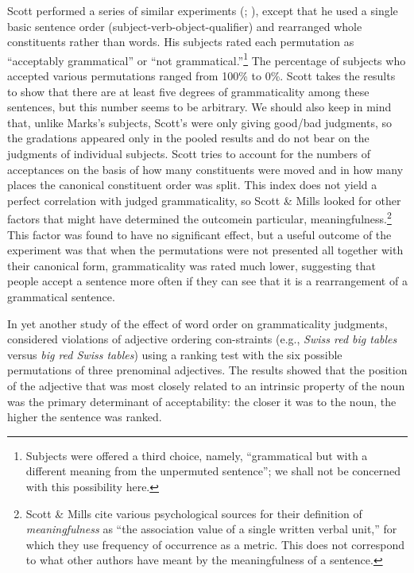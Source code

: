 Scott performed a series of similar experiments (\citealt{Scott1969}; \citealt{ScottEtAl1973}), except that he used a single basic sentence order (subject-verb-object-qualifier) and rearranged whole constituents rather than words. His subjects rated each permutation as ``acceptably grammatical'' or ``not grammatical.''\footnote{Subjects were offered a third choice, namely, ``grammatical but with a different meaning from the unpermuted sentence''; we shall not be concerned with this possibility here.}
The percentage of subjects who accepted various permutations ranged from 100\% to 0\%. Scott takes the results to show that there are at least five degrees of grammaticality among these sentences, but this number seems to be arbitrary. We should also keep in mind that, unlike Marks's subjects, Scott's were only giving good/bad judgments, so the gradations appeared only in the pooled results and do not bear on the judgments of individual subjects. Scott tries to account for the numbers of acceptances on the basis of how many constituents were moved and in how many places the canonical constituent order was split. This index does not yield a perfect correlation with judged grammaticality, so Scott \& Mills looked for other factors that might have determined the outcome\schdash{}in particular, meaningfulness.\footnote{Scott \& Mills cite various psychological sources for their definition of \textit{meaningfulness} as ``the association value of a single written verbal unit,'' for which they use frequency of occurrence as a metric. This does not correspond to what other authors have meant by the meaningfulness of a sentence.}
This factor was found to have no significant effect, but a useful outcome of the experiment was that when the permutations were not presented all together with their canonical form, grammaticality was rated much lower, suggesting that people accept a sentence more often if they can see that it is a rearrangement of a grammatical sentence.

In yet another study of the effect of word order on grammaticality judgments, \citet{DanksEtAl1971} considered violations of adjective ordering con-\linebreak straints (e.g., \textit{Swiss red big tables} versus \textit{big red Swiss tables}) using a ranking test with the six possible permutations of three prenominal adjectives. The results showed that the position of the adjective that was most closely related to an intrinsic property of the noun was the primary determinant of acceptability: the closer it was to the noun, the higher the sentence was ranked.

